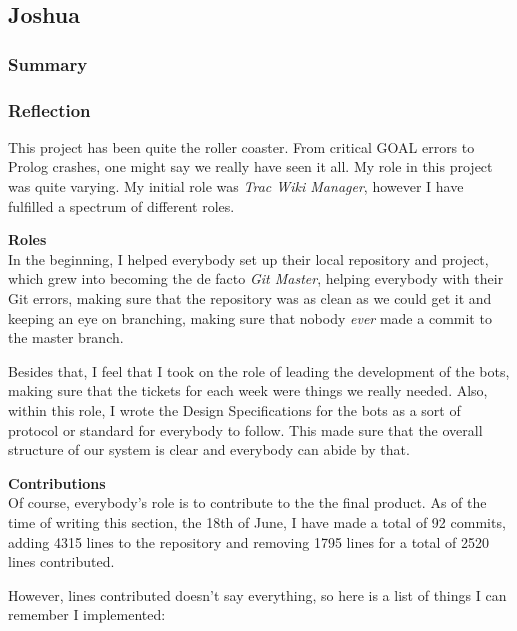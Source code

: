 \newpage
\subsection{Joshua}
\subsubsection{Summary}
\subsubsection{Reflection}
This project has been quite the roller coaster. From critical GOAL errors to Prolog crashes, one might say we really have seen it all. My role in this project was quite varying. My initial role was \emph{Trac Wiki Manager}, however I have fulfilled a spectrum of different roles.

\noindent
\textbf{Roles}\\
In the beginning, I helped everybody set up their local repository and project, which grew into becoming the de facto \emph{Git Master}, helping everybody with their Git errors, making sure that the repository was as clean as we could get it and keeping an eye on branching, making sure that nobody \emph{ever} made a commit to the master branch.

Besides that, I feel that I took on the role of leading the development of the bots, making sure that the tickets for each week were things we really needed. Also, within this role, I wrote the Design Specifications for the bots as a sort of protocol or standard for everybody to follow. This made sure that the overall structure of our system is clear and everybody can abide by that.

\noindent
\textbf{Contributions}\\
Of course, everybody's role is to contribute to the the final product. As of the time of writing this section, the 18th of June, I have made a total of 92 commits, adding 4315 lines to the repository and removing 1795 lines for a total of 2520 lines contributed.

However, lines contributed doesn't say everything, so here is a list of things I can remember I implemented:

